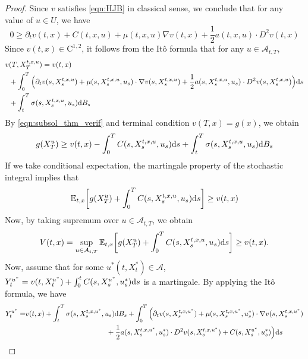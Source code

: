 \documentclass[11pt]{book}
\newcommand{\dd}{\text{\normalfont d}}
\newcommand{\ds}{\text{\normalfont d}s}
\begin{document}
\begin{proof}
Since $v$ satisfies \eqref{eqn:HJB} in classical sense, we conclude that for any value of $u\in U$, we have 
\begin{equation}\label{eqn:subsol_thm_verif}
0\ge\partial_{t}v(t,x)+C(t,x,u)+\mu(t,x,u)\nabla v(t,x)+\frac12{a(t,x,u)}\cdot D^2v(t,x) 
\end{equation}
Since $v(t,x)\in\mathrm{C}^{1,2}$, it follows from the It\^o formula that for any $u\in\mathcal{A}_{t,T}$, 
\begin{equation}
\begin{split}
v&(T,X_T^{t,x,u})=v(t,x)\\
&+\int_0^T\Big(\partial_{t}v(s,X_s^{t,x,u})+\mu(s,X_s^{t,x,u},u_s)\cdot\nabla v(s,X_s^{t,x,u})+\frac12{a(s,X_s^{t,x,u},u_s)}\cdot D^2v(s,X_s^{t,x,u})\Big){{\ds}}\\
&+\int_t^T\sigma(s,X_s^{t,x,u},u_s){\dd}B_s
\end{split}
\end{equation}
By \eqref{eqn:subsol_thm_verif} and terminal condition $v(T,x)=g(x)$, we obtain
\begin{equation}\label{eqn:911}
g(X_T^u)\ge{v}(t,x)-\int_0^TC(s,X_s^{t,x,u},u_s){{\ds}}+\int_t^T\sigma(s,X_s^{t,x,u},u_s){\dd}B_s
\end{equation}
If we take conditional expectation, the martingale property of the stochastic integral implies that
\begin{equation}
\mathbb{E}_{t,x}\bigg[g(X_T^u)+\int_0^TC(s,X_s^{t,x,u},u_s){{\ds}}\bigg]\ge{v}(t,x)
\end{equation}
Now, by taking supremum over $u\in\mathcal{A}_{t,T}$, we obtain
\begin{equation}
V(t,x)=\sup_{u\in\mathcal{A}_{t,T}}\mathbb{E}_{t,x}\bigg[g(X_T^u)+\int_0^TC(s,X_s^{t,x,u},u_s){{\ds}}\bigg]\ge{v}(t,x).
\end{equation}\label{eqn:913}
Now, assume that  for some $u^*(t,X^*_t)\in\mathcal{A}$, $Y^{u^*}_t=v(t,X_t^{u^*})+\int_0^t C(s,X_s^{u^*},u^*_s) {{\ds}}$ is a martingale. By applying the It\^o formula, we have
\begin{equation}
\begin{split}
Y^{u^*}_t=&v(t,x)+\int_t^T\sigma(s,X_s^{t,x,u^*},u_s){\dd}B_s+\int_0^T\Big(\partial_{t}v(s,X_s^{t,x,u^*})+\mu(s,X_s^{t,x,u^*},u^*_s)\cdot \nabla v(s,X_s^{t,x,u^*})\\
&\hspace*{4cm}+\frac12{a(s,X_s^{t,x,u^*},u^*_s)}\cdot D^2v(s,X_s^{t,x,u^*})+C(s,X_s^{u^*},u^*_s)\Big){{\ds}}\\

\end{split}
\end{equation}
\end{proof}
\end{document}
